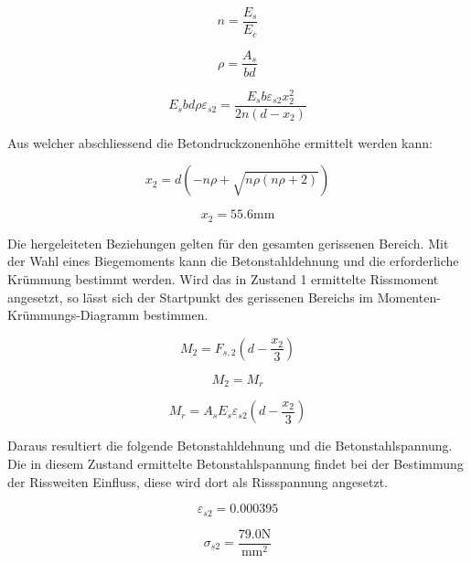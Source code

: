 \documentclass[
  12pt,
  letterpaper,
  egregdoesnotlikesansseriftitles]{scrreprt}
\begin{document}
\begin{equation}n = \frac{E_{s}}{E_{c}}\end{equation}

\begin{equation}\rho = \frac{A_{s}}{b d}\end{equation}

\begin{equation}E_{s} b d \rho \varepsilon_{s2} = \frac{E_{s} b \varepsilon_{s2} x_{2}^{2}}{2 n \left(d - x_{2}\right)}\end{equation}

Aus welcher abschliessend die Betondruckzonenhöhe ermittelt werden kann:

\begin{equation}x_{2} = d \left(- n \rho + \sqrt{n \rho \left(n \rho + 2\right)}\right)\end{equation}

\begin{equation}x_{2} = 55.6 \text{mm}\end{equation}

Die hergeleiteten Beziehungen gelten für den gesamten gerissenen
Bereich. Mit der Wahl eines Biegemoments kann die Betonstahldehnung und
die erforderliche Krümmung bestimmt werden. Wird das in Zustand 1
ermittelte Rissmoment angesetzt, so lässt sich der Startpunkt des
gerissenen Bereichs im Momenten-Krümmungs-Diagramm bestimmen.

\begin{equation}M_{2} = F_{s,2} \left(d - \frac{x_{2}}{3}\right)\end{equation}

\begin{equation}M_{2} = M_{r}\end{equation}

\begin{equation}M_{r} = A_{s} E_{s} \varepsilon_{s2} \left(d - \frac{x_{2}}{3}\right)\end{equation}

Daraus resultiert die folgende Betonstahldehnung und die
Betonstahlspannung. Die in diesem Zustand ermittelte Betonstahlspannung
findet bei der Bestimmung der Rissweiten Einfluss, diese wird dort als
Rissspannung angesetzt.

\begin{equation}\varepsilon_{s2} = 0.000395\end{equation}

\begin{equation}\sigma_{s 2} = \frac{79.0 \text{N}}{\text{mm}^{2}}\end{equation}
\end{document}
